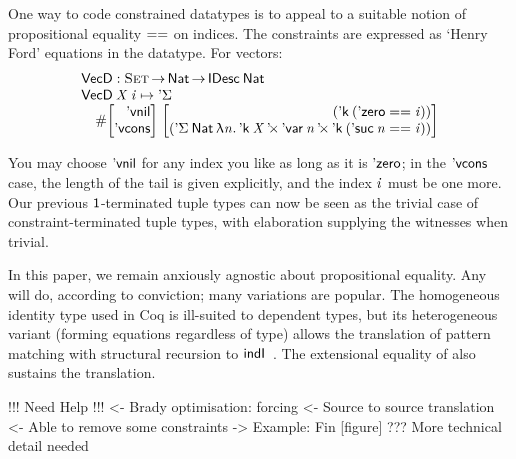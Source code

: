 One way to code constrained datatypes is to appeal to a suitable
notion of propositional equality \(\PropEq\) on indices. The
constraints are expressed as `Henry Ford' equations in the datatype.
For vectors:
%
\[\stk{
\VecD : \Set \To \Nat \To \IDesc{\Nat} \\
\VecD\: \V{X}\: \V{i} \mapsto \SYMBDSigma\\
\quad
\EnumT{\vtup{r}{\VecNil\\ \SYMBVecCons}}
\; \vtup{r}{
                            (\DConst{(\NatZero\PropEq\V{i})}) \\
 ( \DSigma{\Nat}{\LAM{\V{n}}
   \DProd{\DConst{\V{X}}}
     {\DProd{\DVar{\V{n}}}{\DConst{(\NatSuc{\V{n}}\PropEq\V{i})}})}}
                          }
}\]

You may choose $\VecNil$ for any index you like as long as it is
$\NatZero$; in the $\SYMBVecCons$ case, the length of the tail is
given explicitly, and the index $\V{i}$ must be one more. Our previous
\(\Unit\)-terminated tuple types can now be seen as the trivial case
of constraint-terminated tuple types, with elaboration supplying the
witnesses when trivial.

In this paper, we remain anxiously agnostic about
propositional equality. Any will do, according to
conviction; many variations are popular. The
homogeneous identity type used in Coq is ill-suited to
dependent types, but its heterogeneous variant (forming equations
regardless of type) allows the translation of pattern
matching with structural recursion to
\(\F{indI}\)~\cite{goguen:pattern-matching}. The
extensional equality of \citet{altenkirch:ott} also sustains the translation.

\begin{wstructure}
!!! Need Help !!!
<- Brady optimisation: forcing
    <- Source to source translation
    <- Able to remove some constraints
    -> Example: Fin [figure]
    ??? More technical detail needed
\end{wstructure}

